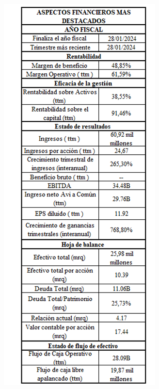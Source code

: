 \documentclass[twocolumn, 12pt]{article}
\begin{document}
\begin{figure}[H]
      \begin{center}
            \includegraphics[width=\linewidth]{./Images/Anexo2.png}
            \caption{}
      \end{center}
\end{figure}
\end{document}
